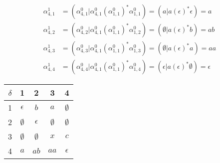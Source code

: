 \documentclass{article}
\begin{document}
\begin{align*}
\alpha^1_{4,1} &= \left(\alpha^0_{4,1}|\alpha^0_{4,1}\left(\alpha^0_{1,1}\right)^*\alpha^0_{1,1}\right) = \left(a|a\left(\epsilon\right)^*\epsilon\right) = a \\
\alpha^1_{4,2} &= \left(\alpha^0_{4,2}|\alpha^0_{4,1}\left(\alpha^0_{1,1}\right)^*\alpha^0_{1,2}\right) = \left(\emptyset|a\left(\epsilon\right)^*b\right) = ab \\
\alpha^1_{4,3} &= \left(\alpha^0_{4,3}|\alpha^0_{4,1}\left(\alpha^0_{1,1}\right)^*\alpha^0_{1,3}\right) = \left(\emptyset|a\left(\epsilon\right)^*a\right) = aa \\
\alpha^1_{4,4} &= \left(\alpha^0_{4,4}|\alpha^0_{4,1}\left(\alpha^0_{1,1}\right)^*\alpha^0_{1,4}\right) = \left(\epsilon|a\left(\epsilon\right)^*\emptyset\right) = \epsilon 
\end{align*}

\begin{center}
\begin{tabular}{c||*{3}{c|}c}
$\delta$ & 1 & 2 & 3 & 4 \\
  \hline \hline
1 & $\epsilon$  & $b$         & $a$         & $\emptyset$ \\ \hline
2 & $\emptyset$ & $\epsilon$  & $\emptyset$ & $\emptyset$ \\ \hline
3 & $\emptyset$ & $\emptyset$ & $x$         & $c$         \\ \hline
4 & $a$         & $ab$        & $aa$        & $\epsilon$  \\
\end{tabular}
\end{center}
\end{document}
